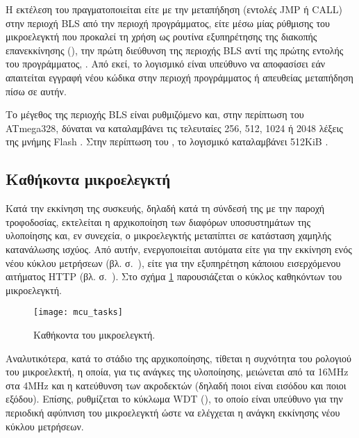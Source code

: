 Η εκτέλεση του  πραγματοποιείται είτε με την μεταπήδηση (εντολές
JMP ή CALL) στην περιοχή BLS από την περιοχή προγράμματος, είτε μέσω μίας
ρύθμισης του μικροελεγκτή που προκαλεί τη χρήση ως ρουτίνα εξυπηρέτησης της
διακοπής επανεκκίνησης (), την πρώτη διεύθυνση της περιοχής BLS αντί
της πρώτης εντολής του προγράμματος, \parencite[273]{atmel13}. Από εκεί, το
λογισμικό  είναι υπεύθυνο να αποφασίσει εάν απαιτείται εγγραφή
νέου κώδικα στην περιοχή προγράμματος ή απευθείας μεταπήδηση πίσω σε αυτήν.

Το μέγεθος της περιοχής BLS είναι ρυθμιζόμενο και, στην περίπτωση του ATmega328,
δύναται να καταλαμβάνει τις τελευταίες 256, 512, 1024 ή 2048 λέξεις της μνήμης
Flash \parencite[282]{atmel13}. Στην περίπτωση του ,
το λογισμικό  καταλαμβάνει 512KiB \parencite{arduino:uno}.


\subsection{Καθήκοντα μικροελεγκτή}

Κατά την εκκίνηση της συσκευής, δηλαδή κατά τη σύνδεσή της με την παροχή
τροφοδοσίας, εκτελείται η αρχικοποίηση των διαφόρων υποσυστημάτων της υλοποίησης
και, εν συνεχεία, ο μικροελεγκτής μεταπίπτει σε κατάσταση χαμηλής κατανάλωσης
ισχύος. Από αυτήν, ενεργοποιείται αυτόματα είτε για την εκκίνηση ενός νέου
κύκλου μετρήσεων (βλ.  σ.~\pageref{sec:task}), είτε για την
εξυπηρέτηση κάποιου εισερχόμενου αιτήματος HTTP (βλ.  σ.~\pageref{sec:network:impl-resources}). Στο σχήμα
\ref{fig:mcu:tasks} παρουσιάζεται ο κύκλος καθηκόντων του μικροελεγκτή.

\begin{figure}
    \caption{Καθήκοντα του μικροελεγκτή.\label{fig:mcu:tasks}}
    \begin{center}
    \texttt{[image: mcu\_tasks]}
    \end{center}
\end{figure}

Αναλυτικότερα, κατά το στάδιο της αρχικοποίησης, τίθεται η συχνότητα του
ρολογιού του μικροελεκτή, η οποία, για τις ανάγκες της υλοποίησης, μειώνεται από
τα 16MHz στα 4MHz και η κατεύθυνση των ακροδεκτών (δηλαδή ποιοι είναι εισόδου
και ποιοι εξόδου). Επίσης, ρυθμίζεται το κύκλωμα WDT (), το
οποίο είναι υπεύθυνο για την περιοδική αφύπνιση του μικροελεγκτή ώστε να
ελέγχεται η ανάγκη εκκίνησης νέου κύκλου μετρήσεων.


